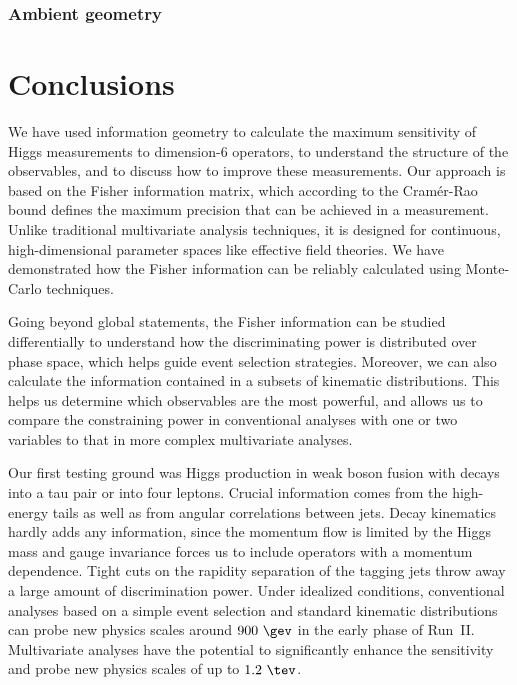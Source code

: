 \subsubsection*{Ambient geometry}




\section{Conclusions}
\label{sec:information_conclusions}

We have used information geometry to calculate the maximum sensitivity
of Higgs measurements to dimension-6 operators, to understand the
structure of the observables, and to discuss how to improve these
measurements. Our approach is based on the Fisher information matrix,
which according to the Cram\'er-Rao bound defines the maximum
precision that can be achieved in a measurement. Unlike traditional
multivariate analysis techniques, it is designed for continuous,
high-dimensional parameter spaces like effective field theories. We
have demonstrated how the Fisher information can be reliably
calculated using Monte-Carlo techniques.

Going beyond global statements, the Fisher information can be studied
differentially to understand how the discriminating power is
distributed over phase space, which helps guide event selection
strategies.  Moreover, we can also calculate the information contained
in a subsets of kinematic distributions. This helps us determine
which observables are the most powerful, and allows us to compare the
constraining power in conventional analyses with one or two variables
to that in more complex multivariate analyses.\bigskip

Our first testing ground was Higgs production in weak boson fusion
with decays into a tau pair or into four leptons. Crucial information
comes from the high-energy tails as well as from angular correlations
between jets. Decay kinematics hardly adds any information, since the
momentum flow is limited by the Higgs mass and gauge invariance forces
us to include operators with a momentum dependence.  Tight cuts on the
rapidity separation of the tagging jets throw away a large amount of
discrimination power. Under idealized conditions, conventional
analyses based on a simple event selection and standard kinematic
distributions can probe new physics scales around $900~\gev$ in the
early phase of Run~II. Multivariate analyses have the potential to
significantly enhance the sensitivity and probe new physics scales of
up to $1.2~\tev$.

